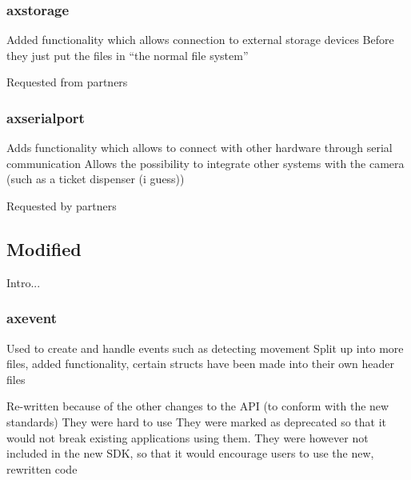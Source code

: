 \documentclass[conference]{IEEEtran}
\begin{document}
\subsubsection{axstorage}

Added functionality which allows connection to external storage devices
Before they just put the files in “the normal file system”



Requested from partners











\subsubsection{axserialport}

Adds functionality which allows to connect with other hardware through serial communication
Allows the possibility to integrate other systems with the camera (such as a ticket dispenser (i guess))

Requested by partners 











\subsection{Modified}
Intro...

\subsubsection{axevent}


Used to create and handle events such as detecting movement 
Split up into more files, added functionality, certain structs have been made into their own header files



Re-written because of the other changes to the API (to conform with the new standards)
They were hard to use
They were marked as deprecated so that it would not break existing applications using them. 
They were however not included in the new SDK, so that it would encourage users to use the new, rewritten code
\end{document}
